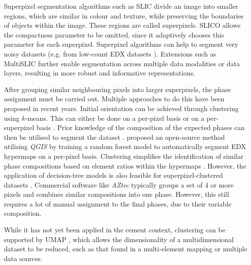 Superpixel segmentation algorithms such as \ac{SLIC} \cite{achanta.2012} divide an image into smaller regions, which are similar in colour and texture, while preserving the boundaries of objects within the image.
These regions are called superpixels.
\ac{SLIC}O allows the compactness parameter to be omitted, since it adaptively chooses this parameter for each superpixel.
Superpixel algorithms can help to segment very noisy datasets (e.g. from low-count \ac{EDX} datasets \cite{georget.2021, jiang.2022}).
Extensions such as Multi\ac{SLIC} \cite{yu.2023} further enable segmentation across multiple data modalities or data layers, resulting in more robust and informative representations.

After grouping similar neighbouring pixels into larger superpixels, the phase assignment must be carried out.
Multiple approaches to do this have been proposed in recent years. 
Initial orientation can be achieved through clustering using $k$-means.
This can either be done on a per-pixel basis \cite{munch.2015} or on a per-superpixel basis \cite{jiang.2022}.
Prior knowledge of the composition of the expected phases can then be utilised to segment the dataset \cite{georget.2021,jiang.2022,reed.2025}.
\textcite{reed.2025} proposed an open-source method utilising \textit{QGIS} \cite{QGIS_software} by training a random forest model to automatically segment \ac{EDX} hypermaps on a per-pixel basis.
Clustering simplifies the identification of similar phase compositions based on element ratios within the hypermaps \cite{georget.2021}.
However, the application of decision-tree models is also feasible for superpixel-clustered datasets \cite{jiang.2022}.
Commercial software like \textit{AZtec} \cite{aztec.2004} typically groups a set of \num{4} or more pixels and combines similar compositions into one phase.
However, this still requires a lot of manual assignment to the final phases, due to their variable composition.

While it has not yet been applied in the cement context, clustering can be supported by \ac{UMAP} \cite{mcinnes.2018}, which allows the dimensionality of a multidimensional dataset to be reduced, such as that found in a multi-element mapping or multiple data sources.




